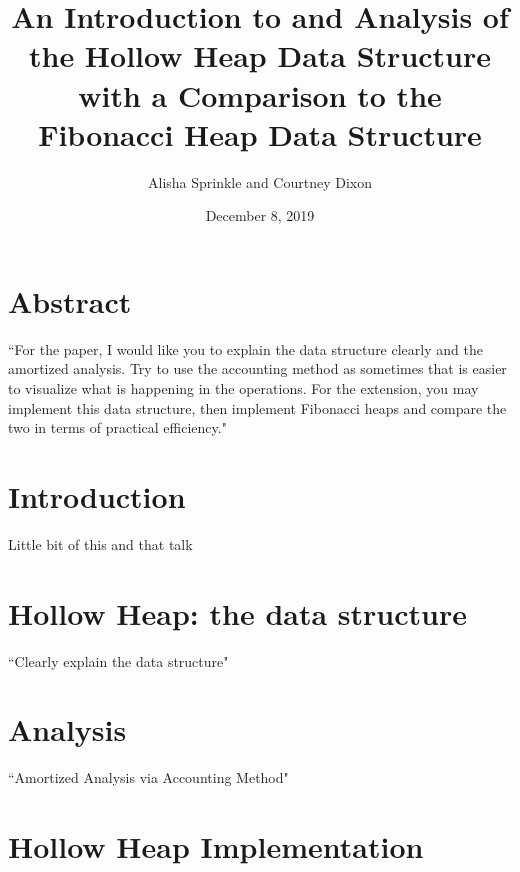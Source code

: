 \documentclass[letter,10pt]{article}
\begin{document}
\title{An Introduction to and Analysis of the Hollow Heap Data Structure with a Comparison to the Fibonacci Heap Data Structure}
\author{Alisha Sprinkle and Courtney Dixon}
\date{December 8, 2019}
\maketitle

\section{Abstract}
``For the paper, I would like you to explain the data structure clearly and the amortized analysis. Try to use the accounting method as sometimes that is easier to visualize what is happening in the operations. For the extension, you may implement this data structure, then implement Fibonacci heaps and compare the two in terms of practical efficiency."

\section{Introduction}
Little bit of this and that talk

\section{Hollow Heap: the data structure}
``Clearly explain the data structure"

\section{Analysis}
``Amortized Analysis via Accounting Method"

\section{Hollow Heap Implementation} 
\end{document}
